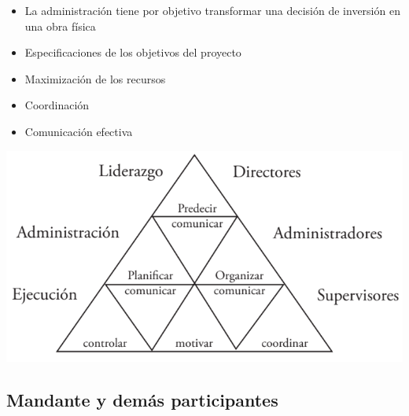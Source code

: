 \documentclass{article} %
\begin{document}
\begin{minipage}{0.45\textwidth}
    \begin{itemize}[label={},left=0pt,align=parleft]
        \item \begin{highlightbox}[levelone] La administración tiene por objetivo transformar una decisión de inversión en una obra física \end{highlightbox}
        \item \begin{highlightbox}[levelone] Especificaciones de los objetivos del proyecto \end{highlightbox}
        \item \begin{highlightbox}[levelone] Maximización de los recursos \end{highlightbox}
        \item \begin{highlightbox}[levelone] Coordinación \end{highlightbox}
        \item \begin{highlightbox}[levelone] Comunicación efectiva \end{highlightbox}
    \end{itemize}
\end{minipage}
\hfill
\begin{minipage}{0.5\textwidth}
    \centering
    \includegraphics[width=1.2\textwidth]{piramide_administracion.png}
\end{minipage}

\subsection{Mandante y demás participantes}
\end{document}
